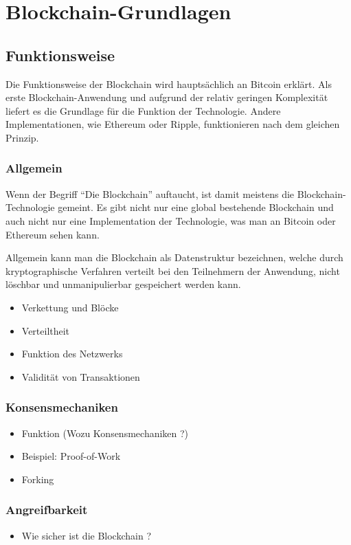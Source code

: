 \chapter{Blockchain-Grundlagen}
\label{cha:grundlagen}

\section{Funktionsweise}
Die Funktionsweise der Blockchain wird hauptsächlich an Bitcoin erklärt. Als erste Blockchain-Anwendung \cite{ZhengBlockchainChallengesOpportunities2017} und aufgrund der relativ geringen Komplexität liefert es die Grundlage für die Funktion der Technologie. Andere Implementationen, wie Ethereum oder Ripple, funktionieren nach dem gleichen Prinzip.

\subsection{Allgemein}
Wenn der Begriff ``Die Blockchain'' auftaucht, ist damit meistens die Blockchain-Technologie gemeint. Es gibt nicht nur eine global bestehende Blockchain und auch nicht nur eine Implementation der Technologie, was man an Bitcoin oder Ethereum sehen kann.

Allgemein kann man die Blockchain als Datenstruktur bezeichnen, welche durch kryptographische Verfahren verteilt bei den Teilnehmern der Anwendung, nicht löschbar und unmanipulierbar gespeichert werden kann.
\begin{itemize}  
  \item Verkettung und Blöcke
  \item Verteiltheit
  \item Funktion des Netzwerks
  \item Validität von Transaktionen
\end{itemize}

\subsection{Konsensmechaniken}
\begin{itemize}
  \item Funktion (Wozu Konsensmechaniken ?)
  \item Beispiel: Proof-of-Work
  \item Forking
\end{itemize}

\subsection{Angreifbarkeit}
\begin{itemize}
  \item Wie sicher ist die Blockchain ?
\end{itemize}


